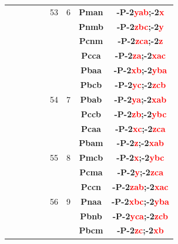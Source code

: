 \documentclass{article}      %
\begin{document}
\begin{small}
\begin{longtable}[c]{|c|c|c|c|c|c|c|c|c|}
	  &  & & & &\textrm{53}  &\textrm{6} &\textbf{Pman}         &\textbf{-P-2\textcolor{red}{yab};-2\textcolor{red}{x}}\\\cline{8-9}       
          &  & & & &  & &\textbf{Pnmb}         &\textbf{-P-2\textcolor{red}{zbc};-2\textcolor{red}{y}}\\\cline{8-9}       
          &  & & & &  & &\textbf{Pcnm}         &\textbf{-P-2\textcolor{red}{zca};-2\textcolor{red}{z}}\\\cline{6-9}       
          &  & & & &  & &\textbf{Pcca}         &\textbf{-P-2\textcolor{red}{za};-2\textcolor{red}{xac}}\\\cline{8-9}      
          &  & & & &  & &\textbf{Pbaa}         &\textbf{-P-2\textcolor{red}{xb};-2\textcolor{red}{yba}}\\\cline{8-9}      
          &  & & & &  & &\textbf{Pbcb}         &\textbf{-P-2\textcolor{red}{yc};-2\textcolor{red}{zcb}}\\\cline{8-9}      
	  &  & & & &\textrm{54}  &\textrm{7} &\textbf{Pbab}         &\textbf{-P-2\textcolor{red}{ya};-2\textcolor{red}{xab}}\\\cline{8-9}      
          &  & & & &  & &\textbf{Pccb}         &\textbf{-P-2\textcolor{red}{zb};-2\textcolor{red}{ybc}}\\\cline{8-9}      
          &  & & & &  & &\textbf{Pcaa}         &\textbf{-P-2\textcolor{red}{xc};-2\textcolor{red}{zca}}\\\cline{6-9}      
          &  & & & &  & &\textbf{Pbam}         &\textbf{-P-2\textcolor{red}{z};-2\textcolor{red}{xab}}\\\cline{8-9}       
	  &  & & & &\textrm{55}  &\textrm{8} &\textbf{Pmcb}         &\textbf{-P-2\textcolor{red}{x};-2\textcolor{red}{ybc}}\\\cline{8-9}       
          &  & & & &  & &\textbf{Pcma}         &\textbf{-P-2\textcolor{red}{y};-2\textcolor{red}{zca}}\\\cline{6-9}       
          &  & & & &  & &\textbf{Pccn}         &\textbf{-P-2\textcolor{red}{zab};-2\textcolor{red}{xac}}\\\cline{8-9}     
	  &  & & & &\textrm{56}  &\textrm{9} &\textbf{Pnaa}         &\textbf{-P-2\textcolor{red}{xbc};-2\textcolor{red}{yba}}\\\cline{8-9}     
          &  & & & &  & &\textbf{Pbnb}         &\textbf{-P-2\textcolor{red}{yca};-2\textcolor{red}{zcb}}\\\cline{6-9}     
          &  & & & &  & &\textbf{Pbcm}         &\textbf{-P-2\textcolor{red}{zc};-2\textcolor{red}{xb}}\\\cline{8-9}       

\end{longtable}
\end{small}
\end{document}
